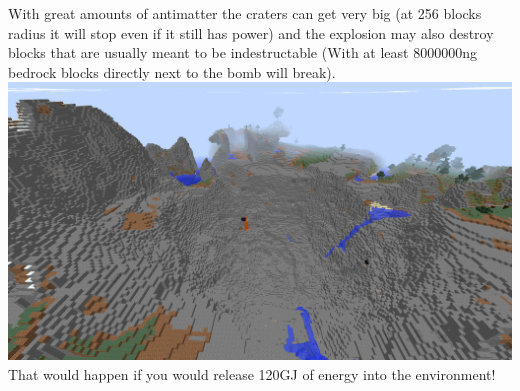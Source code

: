 \documentclass[11pt]{article} %
\begin{document}
With great amounts of antimatter the craters can get very big (at 256 blocks radius it will stop even if it still has power) and the explosion may also destroy blocks that are usually meant to be indestructable (With at least 8000000ng bedrock blocks directly next to the bomb will break). \\
\includegraphics[width = \textwidth]{antimatterExpl1} \\
That would happen if you would release 120GJ of energy into the environment!
\end{document}
